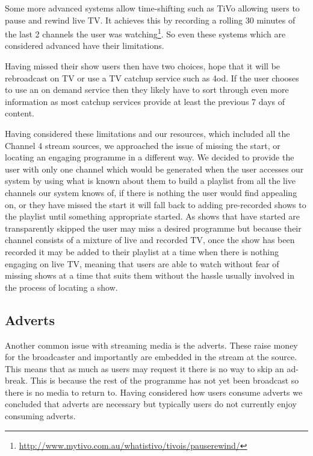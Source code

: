 Some more advanced systems allow time-shifting such as TiVo allowing users to pause and rewind live TV. It achieves this by recording a rolling 30 minutes of the last 2 channels the user was watching\footnote{\url{http://www.mytivo.com.au/whatistivo/tivois/pauserewind/}}. So even these systems which are considered advanced have their limitations. 

Having missed their show users then have two choices, hope that it will be rebroadcast on TV or use a TV catchup service such as 4od. If the user chooses to use an on demand service then they likely have to sort through even more information as most catchup services provide at least the previous 7 days of content.

Having considered these limitations and our resources, which included all the Channel 4 stream sources, we approached the issue of missing the start, or locating an engaging programme in a different way. We decided to provide the user with only one channel which would be generated when the user accesses our system by using what is known about them to build a playlist from all the live channels our system knows of, if there is nothing the user would find appealing on, or they have missed the start it will fall back to adding pre-recorded shows to the playlist until something appropriate started. As shows that have started are transparently skipped the user may miss a desired programme but because their channel consists of a mixture of live and recorded TV, once the show has been recorded it may be added to their playlist at a time when there is nothing engaging on live TV, meaning that users are able to watch without fear of missing shows at a time that suits them without the hassle usually involved in the process of locating a show.

\subsection{Adverts}
Another common issue with streaming media is the adverts. These raise money for the broadcaster and importantly are embedded in the stream at the source. This means that as much as users may request it there is no way to skip an ad-break. This is because the rest of the programme has not yet been broadcast so there is no media to return to. Having considered how users consume adverts we concluded that adverts are necessary but typically users do not currently enjoy consuming adverts.

